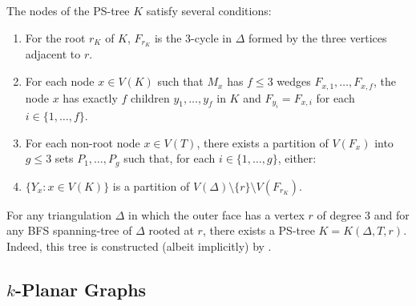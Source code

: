 \documentclass{patmorin}
\newcommand{\note}[2]{{\color{red}[#1:~#2]}}
\renewcommand{\proplabel}[1]{\label{prop:#1}}
\renewcommand{\propref}[1]{(PR\ref{prop:#1})}
\begin{document}
The nodes of the PS-tree $K$ satisfy several conditions:
\begin{enumerate}[(PR1)]
  \item For the root $r_K$ of $K$, $F_{r_K}$ is the 3-cycle in $\Delta$ formed by the three vertices adjacent to $r$.
  
  \item \proplabel{children} For each node $x\in V(K)$ such that $M_x$ has $f\le 3$ wedges $F_{x,1},\ldots,F_{x,f}$, the node $x$ has exactly $f$ children $y_1,\ldots,y_f$ in $K$ and $F_{y_i} = F_{x,i}$ for each $i\in\{1,\ldots,f\}$.
  
  \item \proplabel{ancestor-boundary} For each non-root node $x\in V(T)$, there exists a partition of $V(F_x)$ into $g\le 3$ sets $P_1,\ldots,P_g$ such that, for each $i\in\{1,\ldots,g\}$, either:
  \item \proplabel{partition} $\{Y_x : x\in V(K)\}$ is a partition of $V(\Delta)\setminus\{r\}\setminus V(F_{r_K})$.
\end{enumerate}

For any triangulation $\Delta$ in which the outer face has a vertex $r$ of degree 3 and for any BFS spanning-tree of $\Delta$ rooted at $r$, there exists a PS-tree $K=K(\Delta,T,r)$.  Indeed, this tree is constructed (albeit implicitly) by \citet[Proof of Lemma~14]{dujmovic.joret.ea:planar}.


\subsection{$k$-Planar Graphs}
\end{document}
